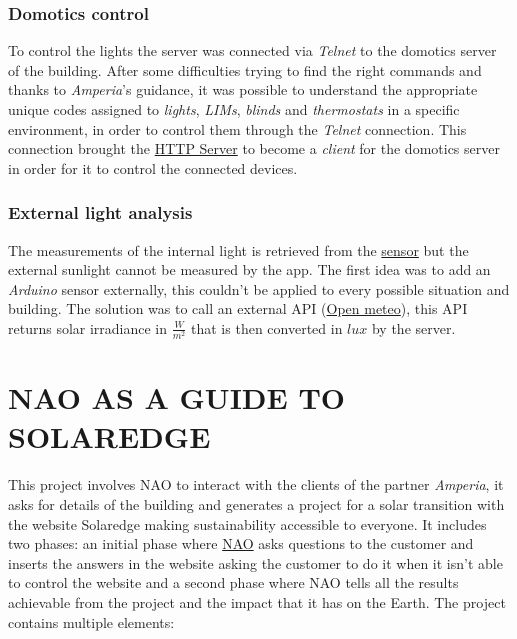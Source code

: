 \documentclass{optica-article}
\begin{document}
\vspace{8pt}
\subsubsection{Domotics control}\label{sec:domotics_domotics_server}
To control the lights the server was connected via \emph{Telnet} to the domotics server of the building. After some difficulties trying to find the right commands and thanks to \emph{Amperia}'s guidance, it was possible to understand the appropriate unique codes assigned to \emph{lights}, \emph{LIMs}, \emph{blinds} and \emph{thermostats} in a specific environment, in order to control them through the \emph{Telnet} connection. This connection brought the \hyperref[sec:domotics_server]{HTTP Server} to become a \emph{client} for the domotics server in order for it to control the connected devices.

\vspace{8pt}
\subsubsection{External light analysis}
The measurements of the internal light is retrieved from the \hyperref[sec:domotics_sensor]{sensor} but the external sunlight cannot be measured by the app. The first idea was to add an \emph{Arduino} sensor externally, this couldn't be applied to every possible situation and building. The solution was to call an external API (\hyperref[https://open-meteo.com/]{Open meteo}), this API returns solar irradiance in $\frac{W}{m^2}$ that is then converted in $lux$ by the server. 

\bigskip 
\section{NAO AS A GUIDE TO SOLAREDGE}\label{sec:solaredge_project}

This project involves NAO to interact with the clients of the partner \emph{Amperia}, it asks for details of the building and generates a project for a solar transition with the website Solaredge making sustainability accessible to everyone. It includes two phases: an initial phase where \hyperref[sec:solaredge_nao]{NAO} asks questions to the customer and inserts the answers in the website asking the customer to do it when it isn't able to control the website and a second phase where NAO tells all the results achievable from the project and the impact that it has on the Earth. The project contains multiple elements:\\
\end{document}
